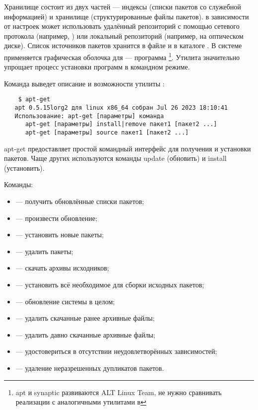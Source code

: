 Хранилище состоит из двух частей --- индексы (списки пакетов со служебной информацией) и
хранилище (структурированные файлы пакетов).
 в зависимости от настроек может использовать удалённый репозиторий
с помощью сетевого протокола (например, ) или локальный репозиторий (например,
на оптическом диске).
Список источников пакетов хранится в файле
 и в каталоге . В системе 
применяется графическая оболочка для  --- программа \footnote{apt и synaptic
	развиваются ALT Linux Team, не нужно сравнивать реализации с аналогичными утилитами в }.
Утилита  значительно упрощает процесс установки программ в командном режиме.


Команда  выведет описание и возможности утилиты :
\begin{verbatim}
    $ apt-get
   apt 0.5.15lorg2 для linux x86_64 собран Jul 26 2023 18:10:41
   Использование: apt-get [параметры] команда
      apt-get [параметры] install|remove пакет1 [пакет2 ...]
      apt-get [параметры] source пакет1 [пакет2 ...]
\end{verbatim}

apt-get предоставляет простой командный интерфейс для получения и
установки пакетов. Чаще других используются команды update (обновить)
и install (установить).
	
Команды:
\begin{itemize}
	\item {} --- получить обновлённые списки пакетов;
	\item {} --- произвести обновление;
	\item {} --- установить новые пакеты;
	\item {} --- удалить пакеты;
	\item {} --- скачать архивы исходников;
	\item {} --- установить всё необходимое для сборки исходных пакетов;
	\item {} --- обновление системы в целом;
	\item {} --- удалить скачанные ранее архивные файлы;
	\item {} --- удалить давно скачанные архивные файлы;
	\item {} --- удостовериться в отсутствии неудовлетворённых зависимостей;
	\item {} --- удаление неразрешенных дупликатов пакетов.
\end{itemize}
	
